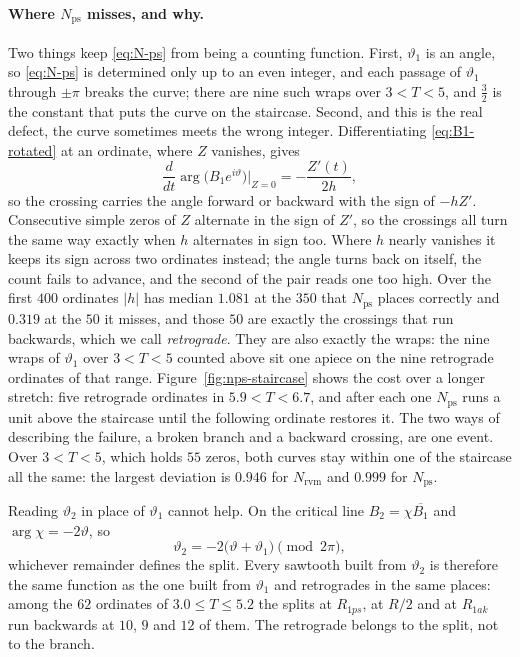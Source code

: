 \documentclass[11pt]{article}
\theoremstyle{definition}
\begin{document}
\paragraph{Where $N_{\mathrm{ps}}$ misses, and why.} Two things keep
\eqref{eq:N-ps} from being a counting function. First, $\vartheta_1$ is an
angle, so \eqref{eq:N-ps} is determined only up to an even integer, and each
passage of $\vartheta_1$ through $\pm\pi$ breaks the curve; there are nine such
wraps over $3<T<5$, and $\tfrac32$ is the constant that puts the curve on the
staircase. Second, and this is the real defect, the curve sometimes meets the
wrong integer. Differentiating \eqref{eq:B1-rotated} at an ordinate, where $Z$
vanishes, gives
\begin{equation}\label{eq:crossing-rate}
\frac{d}{dt}\arg\bigl(B_1e^{i\vartheta}\bigr)\bigg|_{Z=0}=-\frac{Z'(t)}{2h},
\end{equation}
so the crossing carries the angle forward or backward with the sign of $-hZ'$.
Consecutive simple zeros of $Z$ alternate in the sign of $Z'$, so the crossings
all turn the same way exactly when $h$ alternates in sign too. Where $h$ nearly
vanishes it keeps its sign across two ordinates instead; the angle turns back on
itself, the count fails to advance, and the second of the pair reads one too
high. Over the first $400$ ordinates $|h|$ has median $1.081$ at the $350$ that
$N_{\mathrm{ps}}$ places correctly and $0.319$ at the $50$ it misses, and those
$50$ are exactly the crossings that run backwards, which we call
\emph{retrograde}. They are also exactly the
wraps: the nine wraps of $\vartheta_1$ over $3<T<5$ counted above sit one apiece
on the nine retrograde ordinates of that range. Figure~\ref{fig:nps-staircase}
shows the cost over a longer stretch: five retrograde ordinates in
$5.9<T<6.7$, and after each one $N_{\mathrm{ps}}$ runs a unit above the
staircase until the following ordinate restores it. The two ways of describing the
failure, a broken branch and a backward crossing, are one event. Over $3<T<5$, which holds
$55$ zeros, both curves stay within one of the staircase all the same: the
largest deviation is $0.946$ for $N_{\mathrm{rvm}}$ and $0.999$ for
$N_{\mathrm{ps}}$.

Reading $\vartheta_2$ in place of $\vartheta_1$ cannot help. On the critical
line $B_2=\chi\overline{B_1}$ and $\arg\chi=-2\vartheta$, so
\begin{equation}\label{eq:th2-th1}
\vartheta_2=-2\bigl(\vartheta+\vartheta_1\bigr)\pmod{2\pi},
\end{equation}
whichever remainder defines the split. Every sawtooth built from $\vartheta_2$
is therefore the same function as the one built from $\vartheta_1$ and
retrogrades in the same places: among the $62$ ordinates of $3.0\leq T\leq5.2$
the splits at $R_{1ps}$, at $R/2$ and at $R_{1ak}$ run backwards at $10$, $9$
and $12$ of them. The retrograde belongs to the split, not to the branch.
\end{document}
